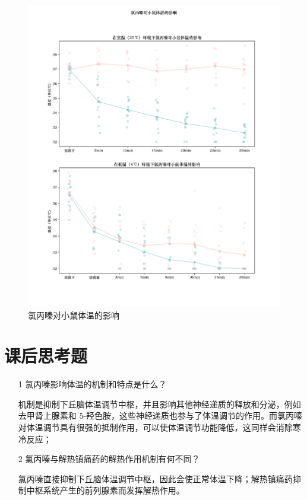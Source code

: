 \documentclass[UTF8]{ctexart}
\begin{document}
\begin{figure}[H]
    \centering
    \includegraphics[scale=0.7]{figure-7_svg.pdf}
    \caption{氯丙嗪对小鼠体温的影响}
\end{figure}

\section{课后思考题}

\begin{itemize}
    \item [1] 氯丙嗪影响体温的机制和特点是什么？

        机制是抑制下丘脑体温调节中枢，并且影响其他神经递质的释放和分泌，例如去甲肾上腺素和 5-羟色胺，这些神经递质也参与了体温调节的作用。而氯丙嗪对体温调节具有很强的抵制作用，可以使体温调节功能降低，这同样会消除寒冷反应；

    \item [2] 氯丙嗪与解热镇痛药的解热作用机制有何不同？

        氯丙嗪直接抑制下丘脑体温调节中枢，因此会使正常体温下降；解热镇痛药抑制中枢系统产生的前列腺素而发挥解热作用。

\end{itemize}
\end{document}
